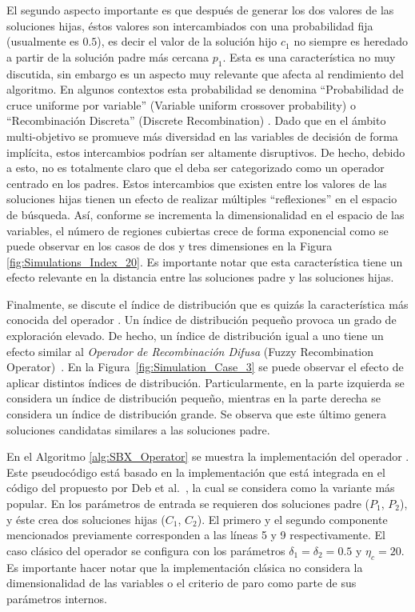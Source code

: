 El segundo aspecto importante es que después de generar los dos valores de las soluciones hijas, éstos valores son intercambiados con una probabilidad fija 
(usualmente es $0.5$), es decir el valor de la solución hijo $c_1$ no siempre es heredado a partir de la solución padre más cercana $p_1$.
%
Esta es una característica no muy discutida, sin embargo es un aspecto muy relevante que afecta al rendimiento del algoritmo.
%
En algunos contextos esta probabilidad se denomina ``Probabilidad de cruce uniforme por variable'' (Variable uniform crossover probability) \cite{tuvsar2007differential} 
o ``Recombinación Discreta'' (Discrete Recombination) \cite{muhlenbein1993predictive}.
%
Dado que en el ámbito multi-objetivo se promueve más diversidad en las variables de decisión de forma implícita, estos intercambios podrían ser altamente disruptivos.
%
De hecho, debido a esto, no es totalmente claro que el \SBX{} deba ser categorizado como un operador centrado en los padres.
%
Estos intercambios que existen entre los valores de las soluciones hijas tienen un efecto de realizar múltiples ``reflexiones'' en el espacio de búsqueda.
%
Así, conforme se incrementa la dimensionalidad en el espacio de las variables, el número de regiones cubiertas crece de forma exponencial como se puede observar en 
los casos de dos y tres dimensiones en la Figura \ref{fig:Simulations_Index_20}.
%
Es importante notar que esta característica tiene un efecto relevante en la distancia entre las soluciones padre y las soluciones hijas.

Finalmente, se discute el índice de distribución que es quizás la característica más conocida del operador \SBX{}.
%
Un índice de distribución pequeño provoca un grado de exploración elevado.
%
De hecho, un índice de distribución igual a uno tiene un efecto similar al \textit{Operador de Recombinación Difusa} (Fuzzy Recombination Operator)~\cite{voigt1995fuzzy}.
%
En la Figura~\ref{fig:Simulation_Case_3} se puede observar el efecto de aplicar distintos índices de distribución.
%
Particularmente, en la parte izquierda se considera un índice de distribución pequeño, mientras en la parte derecha se considera un índice de distribución grande.
%
Se observa que este último genera soluciones candidatas similares a las soluciones padre.

En el Algoritmo \ref{alg:SBX_Operator} se muestra la implementación del operador \SBX{}.
%
Este pseudocódigo está basado en la implementación que está integrada en el código del \NSGAII{} propuesto por Deb et al.~\cite{Joel:NSGAII}, 
la cual se considera como la variante más popular.
%
En los parámetros de entrada se requieren dos soluciones padre ($P_1$, $P_2$), y éste crea dos soluciones hijas ($C_1$, $C_2$).
%
El primero y el segundo componente mencionados previamente corresponden a las líneas 5 y 9 respectivamente.
%
El caso clásico del operador \SBX{} se configura con los parámetros $\delta_1 = \delta_2 = 0.5$ y $\eta_c = 20$.
%
Es importante hacer notar que la implementación clásica no considera la dimensionalidad de las variables o el criterio de paro como parte de sus parámetros internos.

